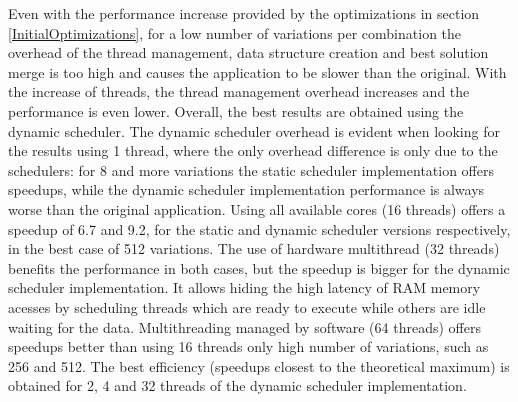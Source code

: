 Even with the performance increase provided by the optimizations in section \ref{InitialOptimizations}, for a low number of variations per combination the overhead of the thread management, data structure creation and best solution merge is too high and causes the application to be slower than the original. With the increase of threads, the thread management overhead increases and the performance is even lower. Overall, the best results are obtained using the dynamic scheduler. The dynamic scheduler overhead is evident when looking for the results using 1 thread, where the only overhead difference is only due to the schedulers: for 8 and more variations the static scheduler implementation offers speedups, while the dynamic scheduler implementation performance is always worse than the original application. Using all available cores (16 threads) offers a speedup of 6.7 and 9.2, for the static and dynamic scheduler versions respectively, in the best case of 512 variations. The use of hardware multithread (32 threads) benefits the performance in both cases, but the speedup is bigger for the dynamic scheduler implementation. It allows hiding the high latency of RAM memory acesses by scheduling threads which are ready to execute while others are idle waiting for the data. Multithreading managed by software (64 threads) offers speedups better than using 16 threads only high number of variations, such as 256 and 512. The best efficiency (speedups closest to the theoretical maximum) is obtained for 2, 4 and 32 threads of the dynamic scheduler implementation.

